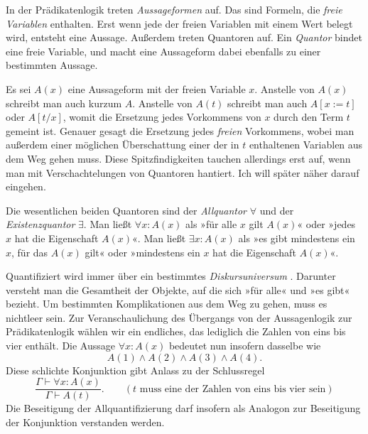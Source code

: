 In der Prädikatenlogik treten \emph{Aussageformen}
auf. Das sind Formeln, die \emph{freie Variablen}
enthalten. Erst wenn jede der freien Variablen mit einem Wert belegt
wird, entsteht eine Aussage. Außerdem treten Quantoren auf. Ein
\emph{Quantor} bindet eine freie Variable, und macht
eine Aussageform dabei ebenfalls zu einer bestimmten Aussage.


Es sei $A(x)$ eine Aussageform mit der freien Variable $x$. Anstelle
von $A(x)$ schreibt man auch kurzum $A$. Anstelle von $A(t)$ schreibt
man auch $A[x:=t]$ oder $A[t/x]$, womit die Ersetzung jedes Vorkommens
von $x$ durch den Term $t$ gemeint ist. Genauer gesagt die Ersetzung
jedes \emph{freien} Vorkommens, wobei man außerdem einer möglichen
Überschattung einer der in $t$ enthaltenen Variablen aus dem Weg gehen
muss. Diese Spitzfindigkeiten tauchen allerdings erst auf, wenn man mit
Verschachtelungen von Quantoren hantiert. Ich will später
näher darauf eingehen.

Die wesentlichen beiden Quantoren sind der \emph{Allquantor}%
 $\forall$ und der
\emph{Existenzquantor} $\exists$. Man ließt
$\forall x\colon A(x)$ als »für alle $x$ gilt $A(x)$« oder »jedes $x$
hat die Eigenschaft $A(x)$«. Man ließt $\exists x\colon A(x)$ als »es
gibt mindestens ein $x$, für das $A(x)$ gilt« oder »mindestens ein $x$
hat die Eigenschaft $A(x)$«.

Quantifiziert wird immer über ein bestimmtes \emph{Diskursuniversum}%
. Darunter versteht man die Gesamtheit der
Objekte, auf die sich »für alle« und »es gibt« bezieht. Um bestimmten
Komplikationen aus dem Weg zu gehen, muss es nichtleer sein. Zur
Veranschaulichung des Übergangs von der Aussagenlogik zur Prädikatenlogik
wählen wir ein endliches, das lediglich die Zahlen von eins bis vier
enthält. Die Aussage $\forall x\colon A(x)$ bedeutet nun insofern
dasselbe wie
\[A(1)\land A(2)\land A(3)\land A(4).\]
Diese schlichte Konjunktion gibt Anlass zu der Schlussregel
\[\dfrac{\Gamma\vdash\forall x\colon A(x)}{\Gamma\vdash A(t)}.
\qquad(\text{$t$ muss eine der Zahlen von eins bis vier sein})\]
Die Beseitigung der Allquantifizierung darf insofern als Analogon zur
Beseitigung der Konjunktion verstanden werden.


